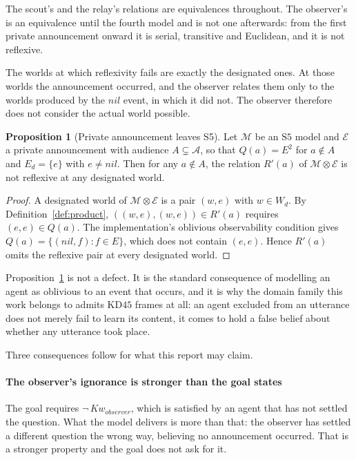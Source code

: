 \documentclass[11pt,a4paper]{article}
\theoremstyle{definition}
\newtheorem{proposition}{Proposition}
\newcommand{\Ag}{\mathcal{A}}
\newcommand{\Mod}{\mathcal{M}}
\newcommand{\Ev}{\mathcal{E}}
\newcommand{\prd}{\otimes}
\newcommand{\Kw}[1]{\mathit{Kw}_{#1}}
\begin{document}
The scout's and the relay's relations are equivalences throughout. The
observer's is an equivalence until the fourth model and is not one afterwards:
from the first private announcement onward it is serial, transitive and
Euclidean, and it is not reflexive.

The worlds at which reflexivity fails are exactly the designated ones. At those
worlds the announcement occurred, and the observer relates them only to the
worlds produced by the $\mathit{nil}$ event, in which it did not. The observer
therefore does not consider the actual world possible.

\begin{proposition}[Private announcement leaves S5]
\label{prop:leaves}
Let $\Mod$ be an $\mathrm{S5}$ model and $\Ev$ a private announcement with
audience $A \subsetneq \Ag$, so that $Q(a) = E^2$ for $a \notin A$ and
$E_d = \{e\}$ with $e \neq \mathit{nil}$. Then for any $a \notin A$, the
relation $R'(a)$ of $\Mod \prd \Ev$ is not reflexive at any designated world.
\end{proposition}

\begin{proof}
A designated world of $\Mod \prd \Ev$ is a pair $(w,e)$ with $w \in W_d$. By
Definition~\ref{def:product}, $((w,e),(w,e)) \in R'(a)$ requires
$(e,e) \in Q(a)$. The implementation's oblivious observability condition gives
$Q(a) = \{(\mathit{nil}, f) : f \in E\}$, which does not contain $(e,e)$.
Hence $R'(a)$ omits the reflexive pair at every designated world.
\end{proof}

Proposition~\ref{prop:leaves} is not a defect. It is the standard consequence
of modelling an agent as oblivious to an event that occurs, and it is why the
domain family this work belongs to admits $\mathrm{KD45}$ frames at all: an
agent excluded from an utterance does not merely fail to learn its content, it
comes to hold a false belief about whether any utterance took place.

Three consequences follow for what this report may claim.

\paragraph{The observer's ignorance is stronger than the goal states} The goal
requires $\neg\,\Kw{\mathit{observer}}$, which is satisfied by an agent that has
not settled the question. What the model delivers is more than that: the
observer has settled a different question the wrong way, believing no
announcement occurred. That is a stronger property and the goal does not ask
for it.
\end{document}
